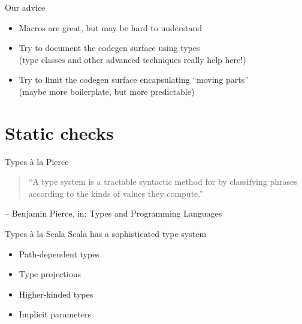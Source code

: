 \documentclass{beamer}
\begin{document}
\begin{frame}[fragile]{Our advice}
  \begin{itemize}
    \item Macros are great, but may be hard to understand
    \item Try to document the codegen surface using types\\
      (type classes and other advanced techniques really help here!)
    \item Try to limit the codegen surface encapsulating ``moving parts''\\
      (maybe more boilerplate, but more predictable)
  \end{itemize}
\end{frame}


  \section{Static checks}

\begin{frame}{Types \`a la Pierce}
  \begin{quote}
    ``A type system is a tractable syntactic method for  by classifying phrases according to the kinds of values they compute.''
  \end{quote}
  \hfill -- Benjamin Pierce, in: Types and Programming Languages
\end{frame}

\begin{frame}{Types \`a la Scala}
  Scala has a sophisticated type system
  \begin{itemize}
    \item Path-dependent types
    \item Type projections
    \item Higher-kinded types
    \item Implicit parameters
  \end{itemize}
\end{frame}
\end{document}
